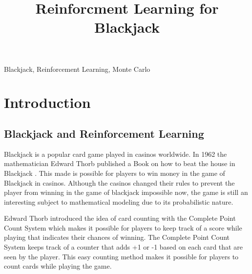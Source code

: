 \documentclass[conference]{IEEEtran}
\begin{document}
\title{Reinforcment Learning for Blackjack}

\author{
}
\maketitle



\begin{abstract}
\end{abstract}

\begin{IEEEkeywords}
	Blackjack, Reinforcement Learning, Monte Carlo
\end{IEEEkeywords}

\section{Introduction}
\subsection{Blackjack and Reinforcement Learning} 
Blackjack is a popular card game played in casinos worldwide. 
In 1962 the mathematician Edward Thorb published a Book on how to beat the house in Blackjack \cite{b1}. 
This made is possible for players to win money in the game of Blackjack in casinos. 
Although the casinos changed their rules to prevent the player from winning in the game of blackjack impossible now, the game is still an interesting subject to mathematical modeling due to its probabilistic nature.    

Edward Thorb introduced the idea of card counting with the Complete Point Count System \cite{b1} which makes it possible for players to keep track of a score while playing that indicates their chances of winning.
The Complete Point Count System keeps track of a counter that adds +1 or -1 based on each card that are seen by the player. 
This easy counting method makes it possible for players to count cards while playing the game. 
\end{document}
